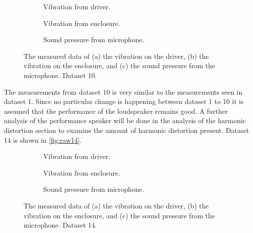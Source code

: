 \begin{figure}[H]
\centering
\begin{subfigure}[t]{0.335\textwidth}
	
	\caption{Vibration from driver.}
	\label{fig:raw_driver10}
\end{subfigure}
\begin{subfigure}[t]{0.3\textwidth}
	
	\caption{Vibration from enclosure.}
	\label{fig:raw_enclosure10}
\end{subfigure}
\begin{subfigure}[t]{0.3\textwidth}
	
	\caption{Sound pressure from microphone.}
	\label{fig:raw_microphone10}
\end{subfigure}
\caption{The measured data of (a) the vibration on the driver, (b) the vibration on the enclosure, and (c) the sound pressure from the microphone. Dataset 10.}
\label{fig:raw10}
\end{figure} 

The measurements from dataset 10 is very similar to the measurements seen in dataset 1. Since no particular change is happening between dataset 1 to 10 it is assumed that the performance of the loudspeaker remains good. A further analysis of the performance speaker will be done in the analysis of the harmonic distortion section to examine the amount of harmonic distortion present. Dataset 14 is shown in \autoref{fig:raw14}. 

\begin{figure}[H]
\centering
\begin{subfigure}[t]{0.335\textwidth}
	
	\caption{Vibration from driver.}
	\label{fig:raw_driver14}
\end{subfigure}
\begin{subfigure}[t]{0.3\textwidth}
	
	\caption{Vibration from enclosure.}
	\label{fig:raw_enclosure14}
\end{subfigure}
\begin{subfigure}[t]{0.3\textwidth}
	
	\caption{Sound pressure from microphone.}
	\label{fig:raw_microphone14}
\end{subfigure}
\caption{The measured data of (a) the vibration on the driver, (b) the vibration on the enclosure, and (c) the sound pressure from the microphone. Dataset 14.}
\label{fig:raw14}
\end{figure} 

